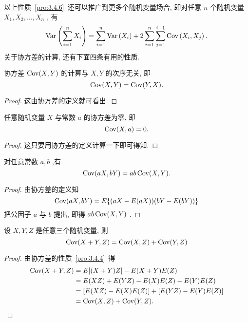 	以上性质~\ref{pro:3.4.6}~还可以推广到更多个随机变量场合, 即对任意 $n$ 个随机变量 $X_1,X_2,\ldots,X_n$ , 有
	\begin{equation}\label{eq:3.4.9}
		\operatorname{Var}\left(\sum_{i=1}^{n} X_{i}\right)=\sum_{i=1}^{n} \operatorname{Var}\left(X_{i}\right)+2 \sum_{i=1}^{n} \sum_{j=1}^{i-1} \operatorname{Cov}\left(X_{i}, X_{j}\right).
	\end{equation}
	关于协方差的计算, 还有下面四条有用的性质.
	\begin{property}\label{pro:3.4.7}
		协方差 $\operatorname{Cov}(X,Y)$ 的计算与 $X,Y$ 的次序无关, 即
		\begin{equation*}
			\operatorname{Cov}(X,Y)=\operatorname{Cov}(Y,X).
		\end{equation*}
		\begin{proof}
			这由协方差的定义就可看出.
		\end{proof}
	\end{property}
	\begin{property}\label{pro:3.4.8}
		任意随机变量 $X$ 与常数 $a$ 的协方差为零, 即
		\begin{equation*}
			\operatorname{Cov}(X,a)=0.
		\end{equation*}
		\begin{proof}
			这只要用协方差的定义计算一下即可得知.
		\end{proof}
	\end{property}
	\begin{property}\label{pro:3.4.9}
		对任意常数 $a,b$ ,有
		\begin{equation*}
			\operatorname{Cov}(a X, b Y)=a b \operatorname{Cov}(X, Y).
		\end{equation*}
		\begin{proof}
			由协方差的定义知
			\begin{equation*}
				\operatorname{Cov}(a X, b Y)=E\{(a X-E(a X))(b Y-E(b Y)) \}
			\end{equation*}
			把公因子 $a$ 与 $b$ 提出, 即得 $ab\operatorname{Cov}(X,Y)$ .
		\end{proof}
	\end{property}
	\begin{property}\label{pro:3.4.10}
		设 $X,Y,Z$ 是任意三个随机变量, 则
		\begin{equation*}
			\operatorname{Cov}(X+Y, Z)=\operatorname{Cov}(X, Z)+\operatorname{Cov}(Y, Z)
		\end{equation*}
		\begin{proof}
			由协方差的性质~\ref{pro:3.4.4}~得
			\begin{align*}
				\operatorname{Cov}(X+Y, Z) &=E[(X+Y) Z]-E(X+Y) E(Z) \\
				&=E(X Z)+E(Y Z)-E(X) E(Z)-E(Y) E(Z) \\
				&=[E(X Z)-E(X) E(Z)]+[E(Y Z)-E(Y) E(Z)] \\
				&=\operatorname{Cov}(X, Z)+\operatorname{Cov}(Y, Z).
			\end{align*}
		\end{proof}
	\end{property}
